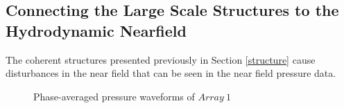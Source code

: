 \documentclass[english]{aiaa-tc}
\begin{document}
\subsection{Connecting the Large Scale Structures to the Hydrodynamic Nearfield}
The coherent structures presented previously in Section \ref{structure} cause disturbances in the near field that can be seen in the near field pressure data.
\begin{figure}
\begin{center}
\begin{centering}

\end{centering}
\caption{Phase-averaged pressure waveforms of $Array~1$}
\label{fig:phaseaxialbothM}
\end{center}
\end{figure}
\end{document}
